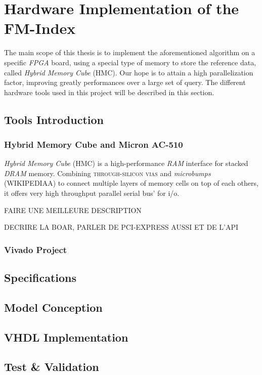 
\chapter{Hardware Implementation of the FM-Index} %

\label{Chapter3} %
The main scope of this thesis is to implement the aforementioned algorithm on a specific \textsl{FPGA} board, using a special type of memory to store the reference data, called \textsl{Hybrid Memory Cube} (HMC). Our hope is to attain a high parallelization factor, improving greatly performances over a large set of query. The different hardware tools used in this project will be described in this section.

\section{Tools Introduction}

\subsection{Hybrid Memory Cube and Micron AC-510}


\textsl{Hybrid Memory Cube} (HMC) is a high-performance \textsl{RAM} interface for stacked \textsl{DRAM} memory. Combining \textsc{through-silicon vias} and \textsl{microbumps} (WIKIPEDIAA) to connect multiple layers of memory cells on top of each others, it offers very high throughput parallel serial bus' for i/o.

FAIRE UNE MEILLEURE DESCRIPTION 

DECRIRE LA BOAR, PARLER DE PCI-EXPRESS AUSSI ET DE L'API

\subsection{Vivado Project}

\section{Specifications}


\section{Model Conception}

\section{VHDL Implementation}


\section{Test \& Validation}













